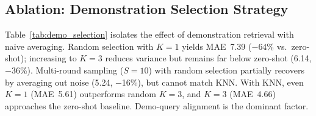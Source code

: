 \documentclass[conference]{IEEEtran}
\begin{document}
\begin{table}[t]
\centering
\caption{Main results on PEMS07M. All ICL methods use $K{=}3$. Best in \textbf{bold}.}
\label{tab:main}
\setlength{\tabcolsep}{3pt}
\scriptsize
{}
\end{table}

\subsection{Ablation: Demonstration Selection Strategy}

Table~\ref{tab:demo_selection} isolates the effect of demonstration retrieval with naive averaging.
Random selection with $K{=}1$ yields MAE~7.39 ($-$64\% vs.\ zero-shot); increasing to $K{=}3$ reduces variance but remains far below zero-shot (6.14, $-$36\%).
Multi-round sampling ($S{=}10$) with random selection partially recovers by averaging out noise (5.24, $-$16\%), but cannot match KNN.
With KNN, even $K{=}1$ (MAE~5.61) outperforms random $K{=}3$, and $K{=}3$ (MAE~4.66) approaches the zero-shot baseline.
Demo-query alignment is the dominant factor.
\end{document}
